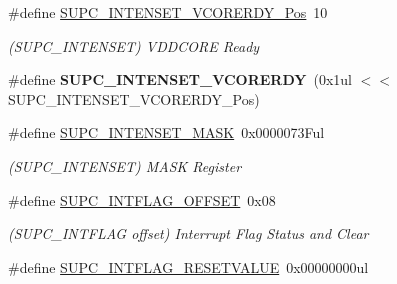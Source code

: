 \begin{DoxyCompactItemize}
\item 
\hypertarget{group___s_a_m_l21___s_u_p_c_ga5bf08743cfe61bf1be9c16ef7fa1f0d8}{}\#define \hyperlink{group___s_a_m_l21___s_u_p_c_ga5bf08743cfe61bf1be9c16ef7fa1f0d8}{S\+U\+P\+C\+\_\+\+I\+N\+T\+E\+N\+S\+E\+T\+\_\+\+V\+C\+O\+R\+E\+R\+D\+Y\+\_\+\+Pos}~10\label{group___s_a_m_l21___s_u_p_c_ga5bf08743cfe61bf1be9c16ef7fa1f0d8}

\begin{DoxyCompactList}\small\item\em (S\+U\+P\+C\+\_\+\+I\+N\+T\+E\+N\+S\+E\+T) V\+D\+D\+C\+O\+R\+E Ready \end{DoxyCompactList}\item 
\hypertarget{group___s_a_m_l21___s_u_p_c_gaedf44a5f4faf98c30b2301a0485546f0}{}\#define {\bfseries S\+U\+P\+C\+\_\+\+I\+N\+T\+E\+N\+S\+E\+T\+\_\+\+V\+C\+O\+R\+E\+R\+D\+Y}~(0x1ul $<$$<$ S\+U\+P\+C\+\_\+\+I\+N\+T\+E\+N\+S\+E\+T\+\_\+\+V\+C\+O\+R\+E\+R\+D\+Y\+\_\+\+Pos)\label{group___s_a_m_l21___s_u_p_c_gaedf44a5f4faf98c30b2301a0485546f0}

\item 
\hypertarget{group___s_a_m_l21___s_u_p_c_gac930c399ced8d8461880977b8a0c9ae7}{}\#define \hyperlink{group___s_a_m_l21___s_u_p_c_gac930c399ced8d8461880977b8a0c9ae7}{S\+U\+P\+C\+\_\+\+I\+N\+T\+E\+N\+S\+E\+T\+\_\+\+M\+A\+S\+K}~0x0000073\+Ful\label{group___s_a_m_l21___s_u_p_c_gac930c399ced8d8461880977b8a0c9ae7}

\begin{DoxyCompactList}\small\item\em (S\+U\+P\+C\+\_\+\+I\+N\+T\+E\+N\+S\+E\+T) M\+A\+S\+K Register \end{DoxyCompactList}\item 
\hypertarget{group___s_a_m_l21___s_u_p_c_ga4a1936e3961dcf8381f7aefdc7c731e6}{}\#define \hyperlink{group___s_a_m_l21___s_u_p_c_ga4a1936e3961dcf8381f7aefdc7c731e6}{S\+U\+P\+C\+\_\+\+I\+N\+T\+F\+L\+A\+G\+\_\+\+O\+F\+F\+S\+E\+T}~0x08\label{group___s_a_m_l21___s_u_p_c_ga4a1936e3961dcf8381f7aefdc7c731e6}

\begin{DoxyCompactList}\small\item\em (S\+U\+P\+C\+\_\+\+I\+N\+T\+F\+L\+A\+G offset) Interrupt Flag Status and Clear \end{DoxyCompactList}\item 
\hypertarget{group___s_a_m_l21___s_u_p_c_ga60a6836752746b29b54cdc022db491d7}{}\#define \hyperlink{group___s_a_m_l21___s_u_p_c_ga60a6836752746b29b54cdc022db491d7}{S\+U\+P\+C\+\_\+\+I\+N\+T\+F\+L\+A\+G\+\_\+\+R\+E\+S\+E\+T\+V\+A\+L\+U\+E}~0x00000000ul\label{group___s_a_m_l21___s_u_p_c_ga60a6836752746b29b54cdc022db491d7}


\end{DoxyCompactItemize}
